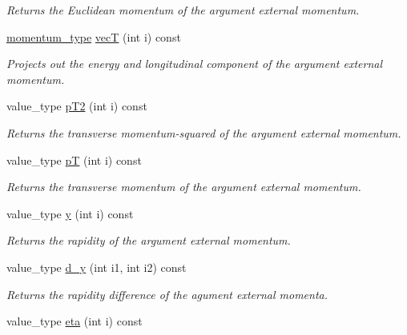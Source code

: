 \begin{DoxyCompactItemize}
\begin{DoxyCompactList}\small\item\em Returns the Euclidean momentum of the argument external momentum. \end{DoxyCompactList}\item 
\hyperlink{a00559}{momentum\-\_\-type} \hyperlink{a00442_a5d27a3b959353ca069e52ce563c69a6d}{vec\-T} (int i) const 
\begin{DoxyCompactList}\small\item\em Projects out the energy and longitudinal component of the argument external momentum. \end{DoxyCompactList}\item 
\hypertarget{a00442_ab9507bc3b8b353cad07df062dfe6b22c}{value\-\_\-type \hyperlink{a00442_ab9507bc3b8b353cad07df062dfe6b22c}{p\-T2} (int i) const }\label{a00442_ab9507bc3b8b353cad07df062dfe6b22c}

\begin{DoxyCompactList}\small\item\em Returns the transverse momentum-\/squared of the argument external momentum. \end{DoxyCompactList}\item 
\hypertarget{a00442_a6d4b77604cf7320e00d0ca61e720990f}{value\-\_\-type \hyperlink{a00442_a6d4b77604cf7320e00d0ca61e720990f}{p\-T} (int i) const }\label{a00442_a6d4b77604cf7320e00d0ca61e720990f}

\begin{DoxyCompactList}\small\item\em Returns the transverse momentum of the argument external momentum. \end{DoxyCompactList}\item 
\hypertarget{a00442_a0a1cc692e9579aeee74eebc0fcd4eb6e}{value\-\_\-type \hyperlink{a00442_a0a1cc692e9579aeee74eebc0fcd4eb6e}{y} (int i) const }\label{a00442_a0a1cc692e9579aeee74eebc0fcd4eb6e}

\begin{DoxyCompactList}\small\item\em Returns the rapidity of the argument external momentum. \end{DoxyCompactList}\item 
\hypertarget{a00442_af629dece8285b64c61332cdb751dec82}{value\-\_\-type \hyperlink{a00442_af629dece8285b64c61332cdb751dec82}{d\-\_\-y} (int i1, int i2) const }\label{a00442_af629dece8285b64c61332cdb751dec82}

\begin{DoxyCompactList}\small\item\em Returns the rapidity difference of the agument external momenta. \end{DoxyCompactList}\item 
\hypertarget{a00442_abf2be786c051c6aa81c96a5873117f0b}{value\-\_\-type \hyperlink{a00442_abf2be786c051c6aa81c96a5873117f0b}{eta} (int i) const }\label{a00442_abf2be786c051c6aa81c96a5873117f0b}


\end{DoxyCompactItemize}
